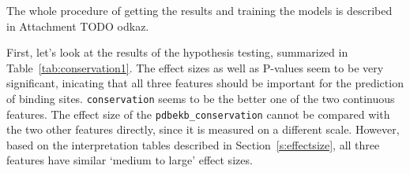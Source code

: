 The whole procedure of getting the results and training the models is described in Attachment TODO odkaz.

First, let's look at the results of the hypothesis testing, summarized in Table~\ref{tab:conservation1}. The effect sizes as well as P-values seem to be very significant, inicating that all three features should be important for the prediction of binding sites. \texttt{conservation} seems to be the better one of the two continuous features. The effect size of the \texttt{pdbekb\_conservation} cannot be compared with the two other features directly, since it is measured on a different scale. However, based on the interpretation tables described in Section~\ref{s:effectsize}, all three features have similar `medium to large' effect sizes.

